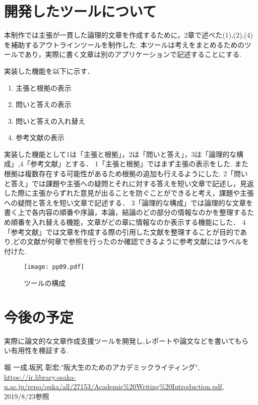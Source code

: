 \documentclass[twocolumn,10pt,a4j]{jsarticle}
\begin{document}
\section{開発したツールについて}
本制作では主張が一貫した論理的文章を作成するために，2章で述べた(1),(2),(4)を補助するアウトラインツールを制作した.
本ツールは考えをまとめるためのツールであり，実際に書く文章は別のアプリケーションで記述することにする.

実装した機能を以下に示す．
\begin{enumerate}
  \item 主張と根拠の表示
  \item 問いと答えの表示
  \item 問いと答えの入れ替え
  \item 参考文献の表示
\end{enumerate}

実装した機能として\textcircled{\scriptsize{1}}は「主張と根拠」，\textcircled{\scriptsize{2}}は「問いと答え」，\textcircled{\scriptsize{3}}は「論理的な構成」,\textcircled{\scriptsize{4}}「参考文献」とする．
\textcircled{\scriptsize{1}}「主張と根拠」ではまず主張の表示をした.
また根拠は複数存在する可能性があるため根拠の追加も行えるようにした.
\textcircled{\scriptsize{2}}「問いと答え」では課題や主張への疑問とそれに対する答えを短い文章で記述し，見返した際に主張からずれた意見が出ることを防ぐことができると考え，課題や主張への疑問と答えを短い文章で記述する．
\textcircled{\scriptsize{3}}「論理的な構成」では論理的な文章を書く上で各内容の順番や序論，本論，結論のどの部分の情報なのかを整理するため順番を入れ替える機能，文章がどの章に情報なのか表示する機能にした．
\textcircled{\scriptsize{4}}「参考文献」では文章を作成する際の引用した文献を整理することが目的であり,どの文献が何章で参照を行ったのか確認できるように参考文献にはラベルを付けた.


\begin{figure}[h]
\begin{center}
 \texttt{[image: pp09.pdf]}
\end{center}
 \caption{ツールの構成}
 \label{fig:教科書}
\end{figure}

\section{今後の予定}
実際に論文的な文章作成支援ツールを開発し,レポートや論文などを書いてもらい有用性を検証する.

\begin{thebibliography}{99}
 堀 一成,坂尻 彰宏:"阪大生のためのアカデミックライティング",
\url{https://ir.library.osaka-u.ac.jp/repo/ouka/all/27153/Academic%20Writing%20Introduction.pdf}, 2019/8/23参照


\end{thebibliography}
\end{document}
